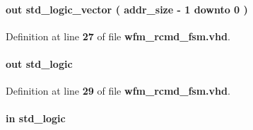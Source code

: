 \paragraph[{rcmd\+\_\+addr}]{ {\bfseries \textcolor{keywordflow}{out}\textcolor{vhdlchar}{ }} {\bfseries \textcolor{comment}{std\+\_\+logic\+\_\+vector}\textcolor{vhdlchar}{ }\textcolor{vhdlchar}{(}\textcolor{vhdlchar}{ }\textcolor{vhdlchar}{ }\textcolor{vhdlchar}{ }\textcolor{vhdlchar}{ }{\bfseries {\bf addr\+\_\+size}} \textcolor{vhdlchar}{-\/}\textcolor{vhdlchar}{ } \textcolor{vhdldigit}{1} \textcolor{vhdlchar}{ }\textcolor{keywordflow}{downto}\textcolor{vhdlchar}{ }\textcolor{vhdlchar}{ } \textcolor{vhdldigit}{0} \textcolor{vhdlchar}{ }\textcolor{vhdlchar}{)}\textcolor{vhdlchar}{ }} \hspace{0.3cm}{\ttfamily [Port]}}\label{classwfm__rcmd__fsm_a43c4fb70a46c2e728fcd1cc13e6f855b}


Definition at line {\bf 27} of file {\bf wfm\+\_\+rcmd\+\_\+fsm.\+vhd}.

\paragraph[{rcmd\+\_\+brst\+\_\+en}]{ {\bfseries \textcolor{keywordflow}{out}\textcolor{vhdlchar}{ }} {\bfseries \textcolor{comment}{std\+\_\+logic}\textcolor{vhdlchar}{ }} \hspace{0.3cm}{\ttfamily [Port]}}\label{classwfm__rcmd__fsm_ac28c9a1f4ce5b2c40fb8f2e4c53af687}


Definition at line {\bf 29} of file {\bf wfm\+\_\+rcmd\+\_\+fsm.\+vhd}.

\paragraph[{rcmd\+\_\+clk}]{ {\bfseries \textcolor{keywordflow}{in}\textcolor{vhdlchar}{ }} {\bfseries \textcolor{comment}{std\+\_\+logic}\textcolor{vhdlchar}{ }} \hspace{0.3cm}{\ttfamily [Port]}}\label{classwfm__rcmd__fsm_a786c634c7706d2b15cba8b3621002f7a}


